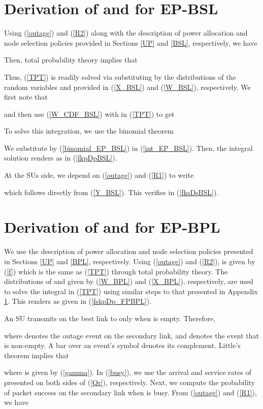 \documentclass[journal,twocolumn]{IEEEtran}
\begin{document}
\section{Derivation of  and  for EP-BSL} \label{EP-BSL}
Using (\ref{outage}) and (\ref{R2}) along with the description of power allocation and node selection policies provided in Sections \ref{UP} and \ref{BSL}, respectively, we have

Then, total probability theory implies that

Thus, (\ref{TPT}) is readily solved via substituting by the distributions of the random variables  and  provided in (\ref{X_BSL}) and (\ref{W_BSL}), respectively. We first note that 

and then use (\ref{W_CDF_BSL}) with  in (\ref{TPT}) to get
 
To solve this integration, we use the binomial theorem
 
We substitute by (\ref{binomial_EP_BSL}) in (\ref{int_EP_BSL}). Then, the integral solution renders  as in (\ref{fkpDpBSL}).

At the SUs side, we depend on (\ref{outage}) and (\ref{R1}) to write

which follows directly from (\ref{Y_BSL}). This verifies  in (\ref{fksDsBSL}).



\section{Derivation of  and  for EP-BPL} \label{EP-BPL}
We use the description of power allocation and node selection policies presented in Sections \ref{UP} and \ref{BPL}, respectively. Using (\ref{outage}) and (\ref{R2}),  is given by (\ref{f}) which is the same as (\ref{TPT}) through total probability theory. 
The distributions of  and  given by (\ref{W_BPL}) and (\ref{X_BPL}), respectively, are used to solve the integral in (\ref{TPT}) using similar steps to that presented in Appendix \ref{EP-BSL}. This renders  as given in (\ref{fskpDp_FPBPL}).

An SU transmits on the best link to  only when  is empty. Therefore,

where  denotes the outage event on the secondary link, and  denotes the event that  is non-empty. A bar over an event's symbol denotes its complement. Little's theorem \cite{Bertsekas} implies that

where  is given by (\ref{gamma}). In (\ref{busy}), we use the arrival and service rates of  presented on both sides of
(\ref{Qr}), respectively. Next, we compute the probability of packet success on the secondary link when  is busy. From (\ref{outage}) and (\ref{R1}), we have
\end{document}

